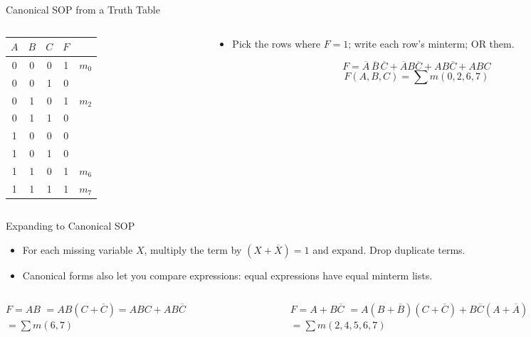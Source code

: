\documentclass[9pt,aspectratio=169,xcolor=table]{beamer}
\begin{document}
\begin{frame}{Canonical SOP from a Truth Table}
  \begin{columns}[c]
  \begin{column}{.4\textwidth}
    \centering\small
    \begin{tabular}{ccc|cl}
      \toprule
      $A$ & $B$ & $C$ & $F$ & \\
      \midrule
      0 & 0 & 0 & 1 & $m_0$ \\
      0 & 0 & 1 & 0 & \\
      0 & 1 & 0 & 1 & $m_2$ \\
      0 & 1 & 1 & 0 & \\
      1 & 0 & 0 & 0 & \\
      1 & 0 & 1 & 0 & \\
      1 & 1 & 0 & 1 & $m_6$ \\
      1 & 1 & 1 & 1 & $m_7$ \\
      \bottomrule
    \end{tabular}
  \end{column}
  \begin{column}{.58\textwidth}
    \begin{itemize}\small\itemsep3pt
      \item Pick the rows where $F = 1$; write each row's minterm; OR them.
    \end{itemize}
    \[ F = \overline{A}\,\overline{B}\,\overline{C} + \overline{A}B\overline{C} + AB\overline{C} + ABC \]
    \[ F(A,B,C) = \sum m(0,2,6,7) \]
  \end{column}
  \end{columns}
\end{frame}

\begin{frame}{Expanding to Canonical SOP}
  \begin{itemize}\small\itemsep2pt
    \item For each missing variable $X$, multiply the term by $(X + \overline{X}) = 1$ and expand. Drop duplicate terms.
    \item Canonical forms also let you compare expressions: equal expressions have equal minterm lists.
  \end{itemize}
  \begin{columns}[t]
  \begin{column}{.48\textwidth}
    \begin{block}{$F = AB$}
      \small
      $= AB(C + \overline{C}) = ABC + AB\overline{C}$\\
      $= \sum m(6,7)$
    \end{block}
  \end{column}
  \begin{column}{.5\textwidth}
    \begin{block}{$F = A + B\overline{C}$}
      \small
      $= A(B+\overline{B})(C+\overline{C}) + B\overline{C}(A+\overline{A})$\\
      $= \sum m(2,4,5,6,7)$
    \end{block}
  \end{column}
  \end{columns}
\end{frame}
\end{document}
